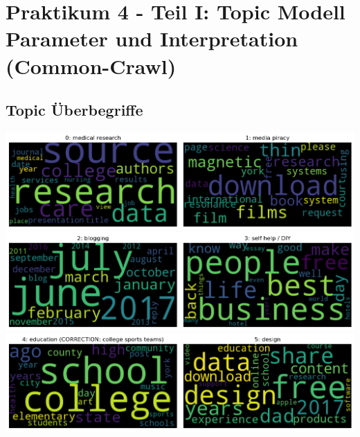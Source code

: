 \newpage
\section{Praktikum 4 - Teil I: Topic Modell Parameter und Interpretation (Common-Crawl)}

\subsection{Topic Überbegriffe}

\includegraphics[width=0.5\textwidth]{images/cc0.png}\includegraphics[width=0.5\textwidth]{images/cc1.png} \\
\includegraphics[width=0.5\textwidth]{images/cc2.png}\includegraphics[width=0.5\textwidth]{images/cc3.png} \\
\includegraphics[width=0.5\textwidth]{images/cc4.png}\includegraphics[width=0.5\textwidth]{images/cc5.png} \\
